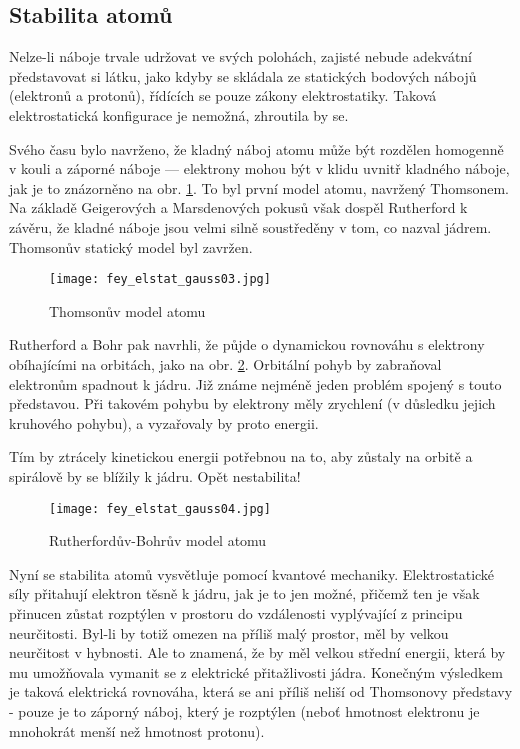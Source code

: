     \subsection{Stabilita atomů}
      Nelze-li náboje trvale udržovat ve svých polohách, zajisté nebude adekvátní představovat si látku, jako 
      kdyby se skládala ze statických bodových nábojů (elektronů a protonů), řídících se pouze zákony 
      elektrostatiky. Taková elektrostatická konfigurace je nemožná, zhroutila by se.
      
      Svého času bylo navrženo, že kladný náboj atomu může být rozdělen homogenně v kouli a záporné náboje — 
      elektrony mohou být v klidu uvnitř kladného náboje, jak je to znázorněno na obr. 
      \ref{fyz:fig_fey_elstat_gauss03}. To byl první model atomu, navržený Thomsonem. Na základě Geigerových 
      a Marsdenových pokusů však dospěl Rutherford k závěru, že kladné náboje jsou velmi silně soustředěny v 
      tom, co nazval jádrem. Thomsonův statický model 
      byl zavržen.
      \begin{figure}[ht!] %
        \centering
        \texttt{[image: fey\_elstat\_gauss03.jpg]}
        \caption{Thomsonův model atomu}
        \label{fyz:fig_fey_elstat_gauss03}
      \end{figure}
      
      Rutherford a Bohr pak navrhli, že půjde o dynamickou rovnováhu s elektrony obíhajícími na orbitách, 
      jako na obr. \ref{fyz:fig_fey_elstat_gauss04}. Orbitální pohyb by zabraňoval elektronům spadnout k 
      jádru. Již známe nejméně jeden problém spojený s touto představou. Při takovém pohybu by elektrony měly 
      zrychlení (v důsledku jejich kruhového pohybu), a vyzařovaly by proto energii.
      
      Tím by ztrácely kinetickou energii potřebnou na to, aby zůstaly na orbitě a spirálově by se blížily k 
      jádru. Opět nestabilita!
      \begin{figure}[ht!] %
        \centering
        \texttt{[image: fey\_elstat\_gauss04.jpg]}
        \caption{Rutherfordův-Bohrův model atomu}
        \label{fyz:fig_fey_elstat_gauss04}
      \end{figure}      
      
      Nyní se stabilita atomů vysvětluje pomocí kvantové mechaniky. Elektrostatické síly přitahují elektron 
      těsně k jádru, jak je to jen možné, přičemž ten je však přinucen zůstat rozptýlen v prostoru do 
      vzdálenosti vyplývající z principu neurčitosti. Byl-li by totiž omezen na příliš malý prostor, měl by 
      velkou neurčitost v hybnosti. Ale to znamená, že by měl velkou střední energii, která by mu umožňovala 
      vymanit se z elektrické přitažlivosti jádra. Konečným výsledkem je taková elektrická rovnováha, která 
      se ani příliš neliší od Thomsonovy představy - pouze je to záporný náboj, který je rozptýlen (neboť 
      hmotnost elektronu je mnohokrát menší než hmotnost protonu).
    
